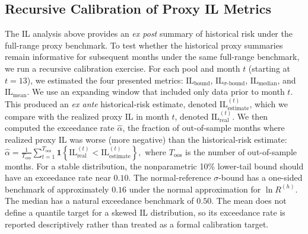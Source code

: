 \documentclass[10pt,conference,compsocconf]{IEEEtran}
\begin{document}
\subsection{Recursive Calibration of Proxy IL Metrics}
\label{subsec:backtesting_il}

The IL analysis above provides an \emph{ex post} summary of historical risk under the full-range proxy benchmark. 
To test whether the historical proxy summaries remain informative for subsequent months under the same full-range benchmark, we run a recursive calibration exercise.
For each pool and month $t$ (starting at $t=13$), we estimated the four presented metrics: $\mathrm{IL}_{\text{bound}}$, $\mathrm{IL}_{\sigma\text{-bound}}$, $\mathrm{IL}_{\text{median}}$, and $\mathrm{IL}_{\text{mean}}$. We use an expanding window that included only data prior to month $t$. 
This produced an \emph{ex ante} historical-risk estimate, denoted $\mathrm{IL}^{(t)}_{\text{estimate}}$, which we compare with the realized proxy IL in month $t$, denoted $\mathrm{IL}^{(t)}_{\text{real}}$.
We then computed the exceedance rate $\hat{\alpha}$, the fraction of out-of-sample months where realized proxy IL was worse (more negative) than the historical-risk estimate:
\(
\hat{\alpha}
= \frac{1}{T_{\text{oos}}}\sum_{t=1}^{T_{\text{oos}}}
\mathbf{1}\!\left\{\mathrm{IL}^{(t)}_{\text{real}} < \mathrm{IL}^{(t)}_{\text{estimate}}\right\},
\)
where $T_{\text{oos}}$ is the number of out-of-sample months. 
For a stable distribution, the nonparametric 10\% lower-tail bound should have an exceedance rate near $0.10$. The normal-reference $\sigma$-bound has a one-sided benchmark of approximately $0.16$ under the normal approximation for $\ln R^{(h)}$. The median has a natural exceedance benchmark of $0.50$. The mean does not define a quantile target for a skewed IL distribution, so its exceedance rate is reported descriptively rather than treated as a formal calibration target.
\end{document}
